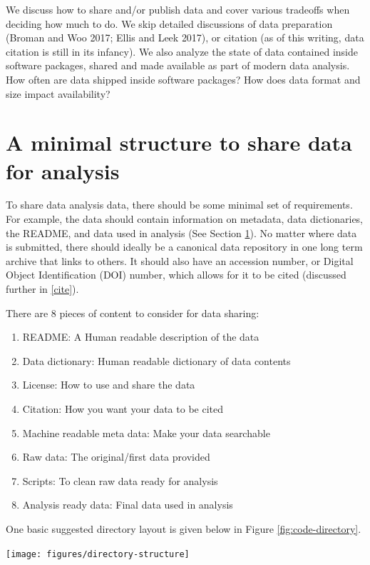 \documentclass[
]{article}
\providecommand{\tightlist}{%
  \setlength{\itemsep}{0pt}\setlength{\parskip}{0pt}}
\let\origfigure\figure
\let\endorigfigure\endfigure
\renewenvironment{figure}[1][2] {
    \expandafter\origfigure\expandafter[H]
} {
    \endorigfigure
}
\begin{document}
We discuss how to share and/or publish data and cover various tradeoffs when deciding how much to do. We skip detailed discussions of data preparation (Broman and Woo 2017; Ellis and Leek 2017), or citation (as of this writing, data citation is still in its infancy). We also analyze the state of data contained inside software packages, shared and made available as part of modern data analysis. How often are data shipped inside software packages? How does data format and size impact availability?

\hypertarget{minimal}{%
\section{A minimal structure to share data for analysis}\label{minimal}}

To share data analysis data, there should be some minimal set of requirements. For example, the data should contain information on metadata, data dictionaries, the README, and data used in analysis (See Section \ref{minimal}). No matter where data is submitted, there should ideally be a canonical data repository in one long term archive that links to others. It should also have an accession number, or Digital Object Identification (DOI) number, which allows for it to be cited (discussed further in \ref{cite}).

There are 8 pieces of content to consider for data sharing:

\begin{enumerate}
\def\labelenumi{\arabic{enumi}.}
\tightlist
\item
  README: A Human readable description of the data
\item
  Data dictionary: Human readable dictionary of data contents
\item
  License: How to use and share the data
\item
  Citation: How you want your data to be cited
\item
  Machine readable meta data: Make your data searchable
\item
  Raw data: The original/first data provided
\item
  Scripts: To clean raw data ready for analysis
\item
  Analysis ready data: Final data used in analysis
\end{enumerate}

One basic suggested directory layout is given below in Figure \ref{fig:code-directory}.

\begin{figure}

{\centering \texttt{[image: figures/directory-structure]} 

}

\caption{Example directory layout and structure for a data repository.}\label{fig:code-directory}
\end{figure}
\end{document}

